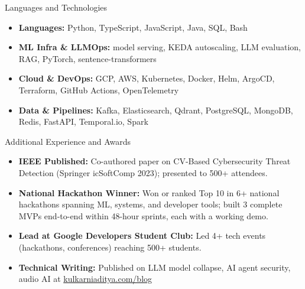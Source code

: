 \documentclass[]{mcdowellcv}
\begin{document}
\begin{cvsection}{Languages and Technologies}
  \begin{cvsubsection}{}{}{}
    \begin{itemize}
      \item \textbf{Languages:} Python, TypeScript, JavaScript, Java, SQL, Bash
      \item \textbf{ML Infra \& LLMOps:} model serving, KEDA autoscaling, LLM evaluation, RAG, PyTorch, sentence-transformers
      \item \textbf{Cloud \& DevOps:} GCP, AWS, Kubernetes, Docker, Helm, ArgoCD, Terraform, GitHub Actions, OpenTelemetry
      \item \textbf{Data \& Pipelines:} Kafka, Elasticsearch, Qdrant, PostgreSQL, MongoDB, Redis, FastAPI, Temporal.io, Spark
    \end{itemize}
  \end{cvsubsection}
\end{cvsection}

\begin{cvsection}{Additional Experience and Awards}
  \begin{cvsubsection}{}{}{}
    \begin{itemize}
      \item \textbf{IEEE Published:} Co-authored paper on CV-Based Cybersecurity Threat Detection (Springer icSoftComp 2023); presented to 500+ attendees.
      \item \textbf{National Hackathon Winner:} Won or ranked Top 10 in 6+ national hackathons spanning ML, systems, and developer tools; built 3 complete MVPs end-to-end within 48-hour sprints, each with a working demo.
      \item \textbf{Lead at Google Developers Student Club:} Led 4+ tech events (hackathons, conferences) reaching 500+ students.
      \item \textbf{Technical Writing:} Published on LLM model collapse, AI agent security, audio AI at \href{https://www.kulkarniaditya.com/blog}{kulkarniaditya.com/blog}
    \end{itemize}
  \end{cvsubsection}
\end{cvsection}
\end{document}
